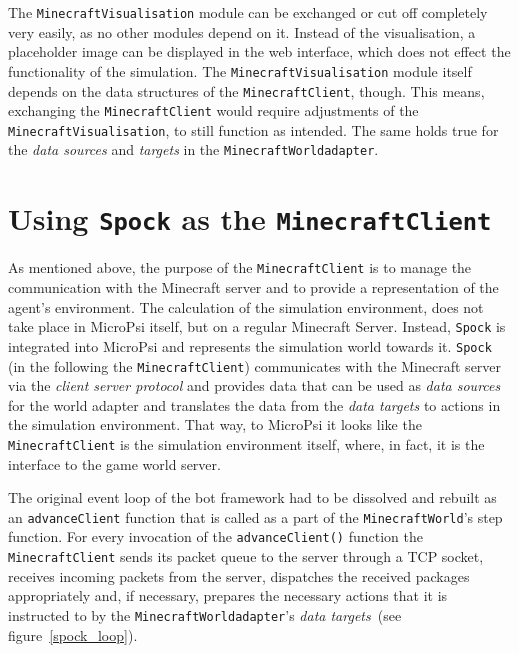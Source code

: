 The \texttt{MinecraftVisualisation} module can be exchanged or cut off completely very easily, as no other modules depend on it. Instead of the visualisation, a placeholder image can be displayed in the web interface, which does not effect the functionality of the simulation. The \texttt{MinecraftVisualisation} module itself depends on the data structures of the \texttt{MinecraftClient}, though. This means, exchanging the \texttt{MinecraftClient} would require adjustments of the \texttt{MinecraftVisualisation}, to still function as intended. The same holds true for the \emph{data sources} and \emph{targets} in the \texttt{MinecraftWorldadapter}.

    \section{Using \texttt{Spock} as the \texttt{MinecraftClient}}

As mentioned above, the purpose of the \texttt{MinecraftClient} is to manage the communication with the Minecraft server and to provide a representation of the agent's environment. The calculation of the simulation environment, does not take place in MicroPsi itself, but on a regular Minecraft Server. Instead, \texttt{Spock} is integrated into MicroPsi and represents the simulation world towards it. \texttt{Spock} (in the following the \texttt{MinecraftClient}) communicates with the Minecraft server via the \emph{client server protocol} and provides data that can be used as \emph{data sources} for the world adapter and translates the data from the \emph{data targets} to actions in the simulation environment. That way, to MicroPsi it looks like the \texttt{MinecraftClient} is the simulation environment itself, where, in fact, it is the interface to the game world server.

The original event loop of the bot framework had to be dissolved and rebuilt as an \texttt{advanceClient} function that is called as a part of the \texttt{MinecraftWorld}'s step function. For every invocation of the \texttt{advanceClient()} function the \texttt{MinecraftClient} sends its packet queue to the server through a TCP socket, receives incoming packets from the server, dispatches the received packages appropriately and, if necessary, prepares the necessary actions that it is instructed to by the \texttt{MinecraftWorldadapter}'s \emph{data targets}~(see figure~\ref{spock_loop}).

